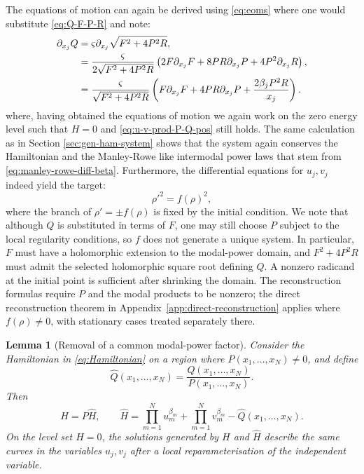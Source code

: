 \documentclass[11pt,a4paper]{article}
\numberwithin{equation}{section}
\newtheorem{lemma}[theorem]{Lemma}
\begin{document}
The equations of motion can again be derived using \eqref{eq:eoms} where one would substitute \eqref{eq:Q-F-P-R} and note:
\begin{align}
    \partial_{x_j}Q &= \varsigma \partial_{x_j} \sqrt{F^2 + 4P^2R}, \notag \\
    &= \frac{\varsigma}{2\sqrt{F^2 + 4P^2R}} \left(2F\partial_{x_j}F + 8PR\partial_{x_j}P + 4P^2\partial_{x_j}R\right), \notag \\
    &= \frac{\varsigma}{\sqrt{F^2 + 4P^2R}} \left(F\partial_{x_j}F + 4PR\partial_{x_j}P + \frac{2\beta_j P^2 R}{x_j}\right).
\end{align}
where, having obtained the equations of motion we again work on the zero energy level such that $H=0$ and \eqref{eq:u-v-prod-P-Q-pos} still holds. 
The same calculation as in Section \ref{sec:gen-ham-system} shows that the system again conserves the Hamiltonian and the Manley-Rowe like intermodal power laws that stem from \eqref{eq:manley-rowe-diff-beta}. 
Furthermore, the differential equations for $u_j, v_j$ indeed yield the target:
\begin{equation}
    {\rho'}^2=f(\rho)^2,
\end{equation} 
where the branch of $\rho'=\pm f(\rho)$ is fixed by the initial condition. 
We note that although $Q$ is substituted in terms of $F$, one may still choose $P$ subject to the local regularity conditions, so $f$ does not generate a unique system.
In particular, $F$ must have a holomorphic extension to the modal-power domain, and $F^2+4P^2R$ must admit the selected holomorphic square root defining $Q$. A nonzero radicand at the initial point is sufficient after shrinking the domain.
The reconstruction formulas require $P$ and the modal products to be nonzero; the direct reconstruction theorem in Appendix~\ref{app:direct-reconstruction} applies where $f(\rho)\ne0$, with stationary cases treated separately there.

\begin{lemma}[Removal of a common modal-power factor]
\label{lem:common-modal-power-factor}
Consider the Hamiltonian in \eqref{eq:Hamiltonian} on a region where $P(x_1,\dots,x_N)\ne0$, and define
\begin{equation}
    \widehat{Q}(x_1,\dots,x_N)
    =\frac{Q(x_1,\dots,x_N)}{P(x_1,\dots,x_N)}.
\end{equation}
Then
\begin{equation}
    H=P\widehat{H},
    \qquad
    \widehat{H}
    =\prod_{m=1}^{N}u_m^{\beta_m}
    +\prod_{m=1}^{N}v_m^{\beta_m}
    -\widehat{Q}(x_1,\dots,x_N).
    \label{eq:Hhat-time-reparam}
\end{equation}
On the level set $H=0$, the solutions generated by $H$ and $\widehat{H}$ describe the same curves in the variables $u_j,v_j$ after a local reparameterisation of the independent variable.
\end{lemma}
\end{document}
